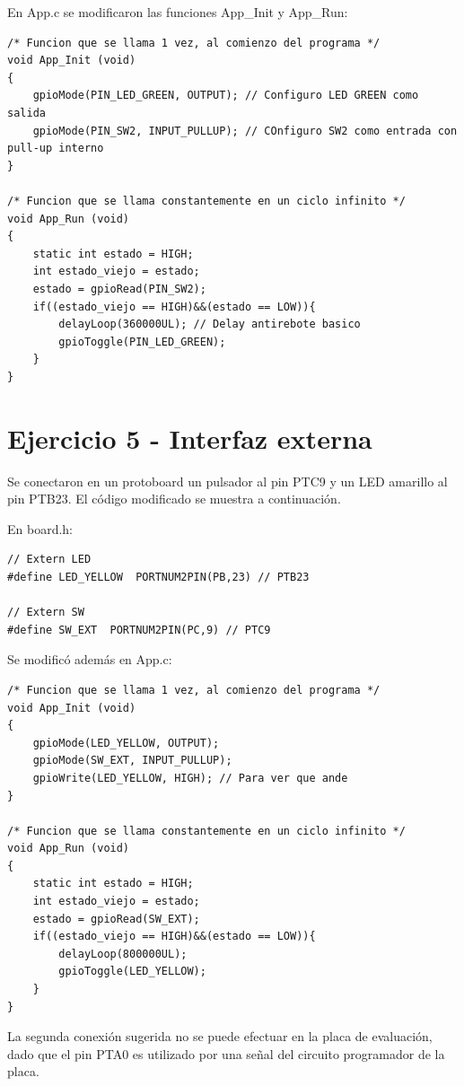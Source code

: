 \documentclass{article}
\begin{document}
En App.c se modificaron las funciones App\_Init y App\_Run:

\begin{lstlisting}
/* Funcion que se llama 1 vez, al comienzo del programa */
void App_Init (void)
{
    gpioMode(PIN_LED_GREEN, OUTPUT); // Configuro LED GREEN como salida
    gpioMode(PIN_SW2, INPUT_PULLUP); // COnfiguro SW2 como entrada con pull-up interno
}

/* Funcion que se llama constantemente en un ciclo infinito */
void App_Run (void)
{
	static int estado = HIGH;
	int estado_viejo = estado;
	estado = gpioRead(PIN_SW2);
	if((estado_viejo == HIGH)&&(estado == LOW)){
		delayLoop(360000UL); // Delay antirebote basico
		gpioToggle(PIN_LED_GREEN);
	}
}
\end{lstlisting}

\newpage

\section*{Ejercicio 5 - Interfaz externa}

Se conectaron en un protoboard un pulsador al pin PTC9 y un LED amarillo al pin PTB23. El código modificado se muestra a continuación.

En board.h:

\begin{lstlisting}
// Extern LED
#define LED_YELLOW	PORTNUM2PIN(PB,23) // PTB23

// Extern SW
#define SW_EXT	PORTNUM2PIN(PC,9) // PTC9
\end{lstlisting}

Se modificó además en App.c:

\begin{lstlisting}
/* Funcion que se llama 1 vez, al comienzo del programa */
void App_Init (void)
{
    gpioMode(LED_YELLOW, OUTPUT);
    gpioMode(SW_EXT, INPUT_PULLUP);
    gpioWrite(LED_YELLOW, HIGH); // Para ver que ande
}

/* Funcion que se llama constantemente en un ciclo infinito */
void App_Run (void)
{
	static int estado = HIGH;
	int estado_viejo = estado;
	estado = gpioRead(SW_EXT);
	if((estado_viejo == HIGH)&&(estado == LOW)){
		delayLoop(800000UL);
		gpioToggle(LED_YELLOW);
	}
}
\end{lstlisting}

La segunda conexión sugerida no se puede efectuar en la placa de evaluación, dado que el pin PTA0 es utilizado por una señal del circuito programador de la placa.
\end{document}
